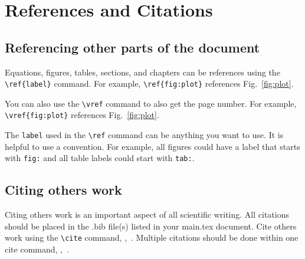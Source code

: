 \section{References and Citations}\label{Sect:ref_cite}

\subsection{Referencing other parts of the document}\label{Sect:ref}
Equations, figures, tables, sections, and chapters can be references using the \verb|\ref{label}| command.  For example, \verb|\ref{fig:plot}| references Fig.~\ref{fig:plot}.  

You can also use the \verb|\vref| command to also get the page number.  For example, \verb|\vref{fig:plot}| references Fig.~\vref{fig:plot}.

The \verb|label| used in the \verb|\ref| command can be anything you want to use. It is helpful to use a convention.  For example, all figures could have a label that starts with \verb|fig:| and all table labels could start with \verb|tab:|.

\subsection{Citing others work}\label{Sect:cite}
Citing others work is an important aspect of all scientific writing.  All citations should be placed in the .bib file(s) listed in your main.tex document.  Cite others work using the \verb|\cite| command, \eg,~\cite{owkes_mesh-decoupled_2015}.  Multiple citations should be done within one cite command, \eg,~\cite{desjardins_direct_2013,owkes_discontinuous_2013,owkes_computational_2014}.  

